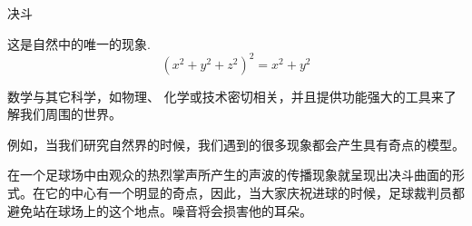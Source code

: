 ﻿\begin{surferPage}{决斗}

这是自然中的唯一的现象.\\
\smallskip
\[(x^2+ y^2+ z^2)^2	= x^2+ y^2\]

\singlespacing

数学与其它科学，如物理、 化学或技术密切相关，并且提供功能强大的工具来了解我们周围的世界。

\singlespacing

例如，当我们研究自然界的时候，我们遇到的很多现象都会产生具有奇点的模型。

\singlespacing

在一个足球场中由观众的热烈掌声所产生的声波的传播现象就呈现出决斗曲面的形式。在它的中心有一个明显的奇点，因此，当大家庆祝进球的时候，足球裁判员都避免站在球场上的这个地点。噪音将会损害他的耳朵。

\end{surferPage}

